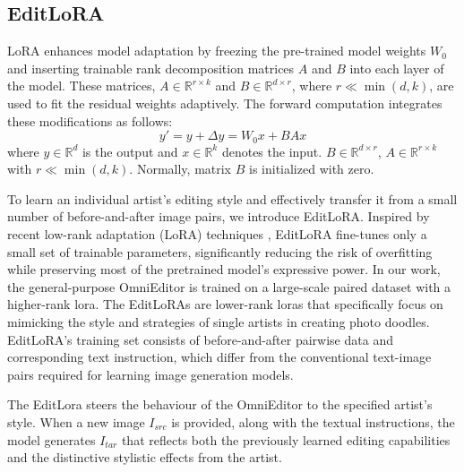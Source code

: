\subsection{EditLoRA }
LoRA \cite{lora} enhances model adaptation by freezing the pre-trained model weights $ W_0 $ and inserting trainable rank decomposition matrices $ A $ and $ B $ into each layer of the model. These matrices, $ A \in \mathbb{R}^{r \times k} $ and $ B \in \mathbb{R}^{d \times r} $, where $ r \ll \min(d, k) $, are used to fit the residual weights adaptively. The forward computation integrates these modifications as follows:
\begin{equation}
y' = y + \Delta y = W_0 x + B A x
\end{equation}
where $ y \in \mathbb{R}^d $ is the output and $ x \in \mathbb{R}^k $ denotes the input. $ B \in \mathbb{R}^{d \times r} $, $ A \in \mathbb{R}^{r \times k} $ with $ r \ll \min(d, k) $. Normally, matrix $ B $ is initialized with zero.

To learn an individual artist's editing style and effectively transfer it from a small number of before-and-after image pairs, we introduce EditLoRA. Inspired by recent low-rank adaptation (LoRA) techniques \cite{makeanything, layertracer}, EditLoRA fine-tunes only a small set of trainable parameters, significantly reducing the risk of overfitting while preserving most of the pretrained model's expressive power. In our work, the general-purpose OmniEditor is trained on a large-scale paired dataset with a higher-rank lora. The EditLoRAs are lower-rank loras that specifically focus on mimicking the style and strategies of single artists in creating photo doodles. EditLoRA's training set consists of before-and-after pairwise data and corresponding text instruction, which differ from the conventional text-image pairs required for learning image generation models.

The EditLora steers the behaviour of the OmniEditor to the specified artist's style. When a new image $I_{src}$ is provided, along with the textual instructions, the model generates $I_{tar}$ that reflects both the previously learned editing capabilities and the distinctive stylistic effects from the artist.





